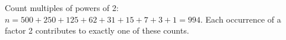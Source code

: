 Count multiples of powers of 2: $n=500+250+125+62+31+15+7+3+1=\boxed{994}$. Each occurrence of a factor 2 contributes to exactly one of these counts.
